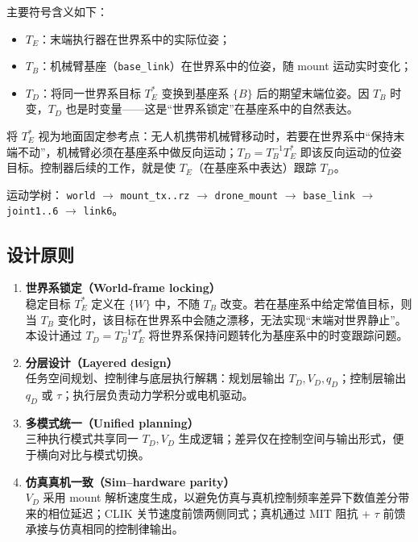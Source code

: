 \documentclass[UTF8, a4paper, 12pt]{ctexart}
\begin{document}
主要符号含义如下：
\begin{itemize}[leftmargin=2em]
    \item $T_E$：末端执行器在世界系中的实际位姿；
    \item $T_B$：机械臂基座（\texttt{base\_link}）在世界系中的位姿，随 mount 运动实时变化；
    \item $T_D$：将同一世界系目标 $T_E^*$ 变换到基座系 $\{B\}$ 后的期望末端位姿。因 $T_B$ 时变，$T_D$ 也是时变量——这是“世界系锁定”在基座系中的自然表达。
\end{itemize}

将 $T_E^*$ 视为地面固定参考点：无人机携带机械臂移动时，若要在世界系中“保持末端不动”，机械臂必须在基座系中做反向运动；$T_D=T_B^{-1}T_E^*$ 即该反向运动的位姿目标。控制器后续的工作，就是使 $T_E$（在基座系中表达）跟踪 $T_D$。

运动学树：
\texttt{world} $\rightarrow$ \texttt{mount\_tx..rz} $\rightarrow$ \texttt{drone\_mount} $\rightarrow$ \texttt{base\_link} $\rightarrow$ \texttt{joint1..6} $\rightarrow$ \texttt{link6}。

\subsection{设计原则}

\begin{enumerate}[label=\textbf{P\arabic*.}, leftmargin=2.5em]
    \item \textbf{世界系锁定（World-frame locking）}\\
    稳定目标 $T_E^*$ 定义在 $\{W\}$ 中，不随 $T_B$ 改变。若在基座系中给定常值目标，则当 $T_B$ 变化时，该目标在世界系中会随之漂移，无法实现“末端对世界静止”。本设计通过 $T_D=T_B^{-1}T_E^*$ 将世界系保持问题转化为基座系中的时变跟踪问题。
    \item \textbf{分层设计（Layered design）}\\
    任务空间规划、控制律与底层执行解耦：规划层输出 $T_D,V_D,q_D$；控制层输出 $q_D$ 或 $\tau$；执行层负责动力学积分或电机驱动。
    \item \textbf{多模式统一（Unified planning）}\\
    三种执行模式共享同一 $T_D,V_D$ 生成逻辑；差异仅在控制空间与输出形式，便于横向对比与模式切换。
    \item \textbf{仿真真机一致（Sim--hardware parity）}\\
    $V_D$ 采用 mount 解析速度生成，以避免仿真与真机控制频率差异下数值差分带来的相位延迟；CLIK 关节速度前馈两侧同式；真机通过 MIT 阻抗 + $\tau$ 前馈承接与仿真相同的控制律输出。
\end{enumerate}
\end{document}

